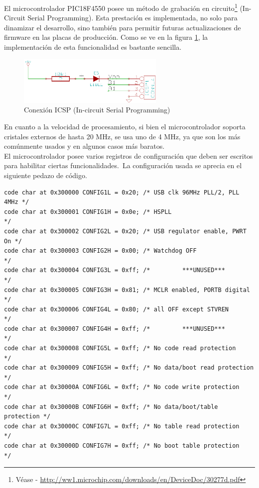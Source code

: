 El microcontrolador PIC18F4550 posee un m\'etodo de grabaci\'on en
circuito\footnote{V\'ease -
\url{http://ww1.microchip.com/downloads/en/DeviceDoc/30277d.pdf}} (In-Circuit
Serial Programming). Esta prestaci\'on es implementada, no solo para dinamizar
el desarrollo, sino tambi\'en para permitir futuras actualizaciones de firmware
en las placas de producci\'on. Como se ve en la figura \ref{fig:icsp}, la
implementaci\'on de esta funcionalidad es bastante sencilla.\\

\begin{figure}[htp]
\centering
\includegraphics[width=7cm]{./img/icsp.png}
\caption{Conexi\'on ICSP (In-circuit Serial Programming)}
\label{fig:icsp}
\end{figure}

En cuanto a la velocidad de procesamiento, si bien el microcontrolador soporta
cristales externos de hasta 20 MHz, se usa uno de 4 MHz, ya que son los m\'as
com\'unmente usados y en algunos casos m\'as baratos.\\

El microcontrolador posee varios registros de configuraci\'on que deben ser
escritos para habilitar ciertas funcionalidades.\
La configuraci\'on usada se aprecia en el siguiente pedazo de c\'odigo.

\begin{lstlisting}
code char at 0x300000 CONFIG1L = 0x20; /* USB clk 96MHz PLL/2, PLL 4MHz */
code char at 0x300001 CONFIG1H = 0x0e; /* HSPLL                         */
code char at 0x300002 CONFIG2L = 0x20; /* USB regulator enable, PWRT On */
code char at 0x300003 CONFIG2H = 0x00; /* Watchdog OFF                  */
code char at 0x300004 CONFIG3L = 0xff; /*         ***UNUSED***          */
code char at 0x300005 CONFIG3H = 0x81; /* MCLR enabled, PORTB digital   */
code char at 0x300006 CONFIG4L = 0x80; /* all OFF except STVREN         */
code char at 0x300007 CONFIG4H = 0xff; /*         ***UNUSED***          */
code char at 0x300008 CONFIG5L = 0xff; /* No code read protection       */
code char at 0x300009 CONFIG5H = 0xff; /* No data/boot read protection  */
code char at 0x30000A CONFIG6L = 0xff; /* No code write protection      */
code char at 0x30000B CONFIG6H = 0xff; /* No data/boot/table protection */
code char at 0x30000C CONFIG7L = 0xff; /* No table read protection      */
code char at 0x30000D CONFIG7H = 0xff; /* No boot table protection      */
\end{lstlisting}


